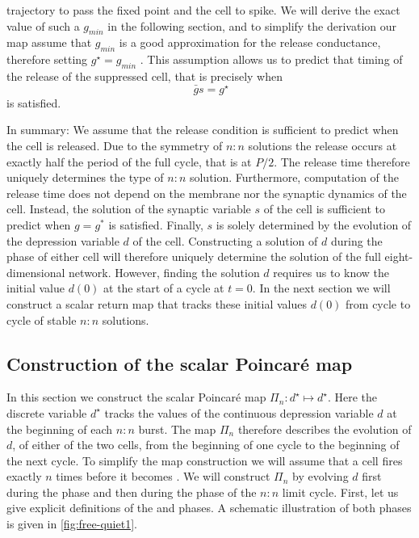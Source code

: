 trajectory to pass the fixed point and the cell to spike.
We will derive the exact value of such a $g_{min}$ in the following section, and to simplify the derivation our map assume that $g_{min}$ is a good approximation for the release conductance, therefore setting $g^\star = g_{min}$ .
This assumption allows us to predict that timing of the release of the suppressed cell, that is precisely when
\begin{equation}
	~\label{eq:release}
	\bar g s=g^{\star}
\end{equation}
is satisfied.

In summary: We assume that the release condition is sufficient to predict when the \suppressed{} cell is released.
Due to the symmetry of $n:n$ solutions the release occurs at exactly half the period of the full cycle, that is at $P/2$.
The release time therefore uniquely determines the type of $n:n$ solution.
Furthermore, computation of the release time does not depend on the membrane nor the synaptic dynamics of the \suppressed{} cell.
Instead, the solution of the synaptic variable $s$ of the \free{} cell is sufficient to predict when $g=g^{*}$ is satisfied.
Finally, $s$ is solely determined by the evolution of the depression variable $d$ of the \free{} cell.
Constructing a solution of $d$ during the \free{} phase of either cell will therefore uniquely determine the solution of the full eight-dimensional network.
However, finding the solution $d$ requires us to know the initial value $d(0)$ at the start of a cycle at $t=0$.
In the next section we will construct a scalar return map that tracks these initial values $d(0)$ from cycle to cycle of stable $n:n$ solutions.

\subsection{Construction of the scalar Poincaré map}
In this section we construct the scalar Poincaré map $\Pi_n:d^{\star}\mapsto d^{\star}$.
Here the discrete variable $d^{\star}$ tracks the values of the continuous depression variable $d$ at the beginning of each $n:n$ burst.
The map $\Pi_n$ therefore describes the evolution of $d$, of either of the two cells, from the beginning of one cycle to the beginning of the next cycle.
To simplify the map construction we will assume that a \free{} cell fires exactly $n$ times before it becomes \suppressed{}.
We will construct $\Pi_n$ by evolving $d$ first during the \free{} phase and then during the \suppressed{} phase of the $n:n$ limit cycle.
First, let us give explicit definitions of the \free{} and \suppressed{} phases.
A schematic illustration of both phases is given in \cref{fig:free-quiet1}.

